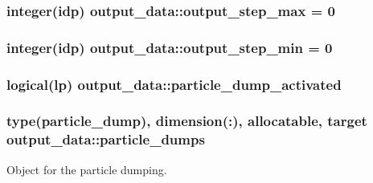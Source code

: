 \subsubsection[{\texorpdfstring{output\+\_\+step\+\_\+max}{output_step_max}}]{\setlength{\rightskip}{0pt plus 5cm}integer(idp) output\+\_\+data\+::output\+\_\+step\+\_\+max = 0}\hypertarget{namespaceoutput__data_a310f5ada2926521513b808272a40764d}{}\label{namespaceoutput__data_a310f5ada2926521513b808272a40764d}
\subsubsection[{\texorpdfstring{output\+\_\+step\+\_\+min}{output_step_min}}]{\setlength{\rightskip}{0pt plus 5cm}integer(idp) output\+\_\+data\+::output\+\_\+step\+\_\+min = 0}\hypertarget{namespaceoutput__data_aea2eeeb3470d4377a87117bb1aeb2ae4}{}\label{namespaceoutput__data_aea2eeeb3470d4377a87117bb1aeb2ae4}
\subsubsection[{\texorpdfstring{particle\+\_\+dump\+\_\+activated}{particle_dump_activated}}]{\setlength{\rightskip}{0pt plus 5cm}logical(lp) output\+\_\+data\+::particle\+\_\+dump\+\_\+activated}\hypertarget{namespaceoutput__data_a8b8e6968d2063ddada37b5d050b011b4}{}\label{namespaceoutput__data_a8b8e6968d2063ddada37b5d050b011b4}
\subsubsection[{\texorpdfstring{particle\+\_\+dumps}{particle_dumps}}]{\setlength{\rightskip}{0pt plus 5cm}type({\bf particle\+\_\+dump}), dimension(\+:), allocatable, target output\+\_\+data\+::particle\+\_\+dumps}\hypertarget{namespaceoutput__data_a5fbbbcc739158cb15a4a02aa8bc63399}{}\label{namespaceoutput__data_a5fbbbcc739158cb15a4a02aa8bc63399}


Object for the particle dumping. 


